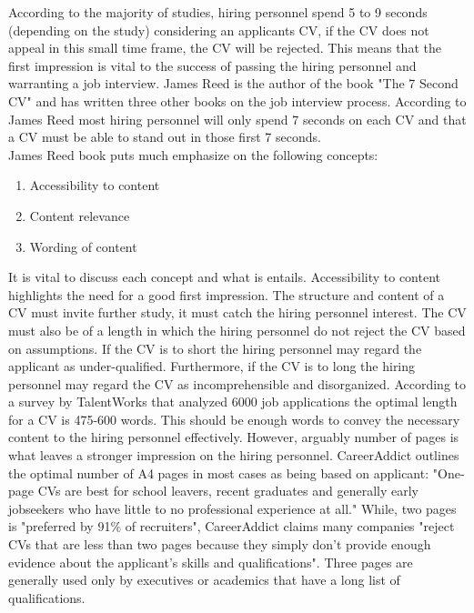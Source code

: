 According to the majority of studies, hiring personnel spend 5 to 9 seconds (depending on the study) considering an applicants CV, if the CV does not appeal in this small time frame, the CV will be rejected.
This means that the first impression is vital to the success of passing the hiring personnel and warranting a job interview.
James Reed is the author of the book "The 7 Second CV" and has written three other books on the job interview process.\cite{7_second_test}
According to James Reed most hiring personnel will only spend 7 seconds on each CV and that a CV must be able to stand out in those first 7 seconds. \cite{7_Seconds_to_Get_a_Recruiter_Attention} \\
James Reed book puts much emphasize on the following concepts:
\begin{enumerate}
   \item Accessibility to content 
   \item Content relevance
   \item Wording of content
\end{enumerate}\cite{7_second_test}
It is vital to discuss each concept and what is entails.
Accessibility to content highlights the need for a good first impression.
The structure and content of a CV must invite further study, it must catch the hiring personnel interest.
The CV must also be of a length in which the hiring personnel do not reject the CV based on assumptions.
If the CV is to short the hiring personnel may regard the applicant as under-qualified.
Furthermore, if the CV is to long the hiring personnel may regard the CV as incomprehensible and disorganized.
According to a survey by TalentWorks that analyzed 6000 job applications the optimal length for a CV is 475-600 words.\cite{CV_Word_length}
This should be enough words to convey the necessary content to the hiring personnel effectively. 
However, arguably number of pages is what leaves a stronger impression on the hiring personnel.
CareerAddict outlines the optimal number of A4 pages in most cases as being based on applicant:\cite{CV_Page_length}
"One-page CVs are best for school leavers, recent graduates and generally early jobseekers who have little to no professional experience at all."\cite{CV_Page_length}
While, two pages is "preferred by 91\% of recruiters", CareerAddict claims many companies "reject CVs that are less than two pages because they simply don’t provide enough evidence about the applicant’s skills and qualifications".\cite{CV_Page_length}
Three pages are generally used only by executives or academics that have a long list of qualifications.
